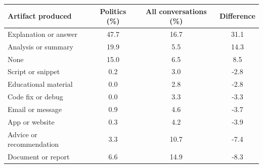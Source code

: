 \begin{tabular}{lccc}
\toprule \toprule
Artifact produced & Politics (\%) & All conversations (\%) & Difference \\
\midrule
Explanation or answer & 47.7 & 16.7 & 31.1 \\
Analysis or summary & 19.9 & 5.5 & 14.3 \\
None & 15.0 & 6.5 & 8.5 \\
Script or snippet & 0.2 & 3.0 & -2.8 \\
Educational material & 0.0 & 2.8 & -2.8 \\
Code fix or debug & 0.0 & 3.3 & -3.3 \\
Email or message & 0.9 & 4.6 & -3.7 \\
App or website & 0.3 & 4.2 & -3.9 \\
Advice or recommendation & 3.3 & 10.7 & -7.4 \\
Document or report & 6.6 & 14.9 & -8.3 \\
\bottomrule \bottomrule
\end{tabular}
